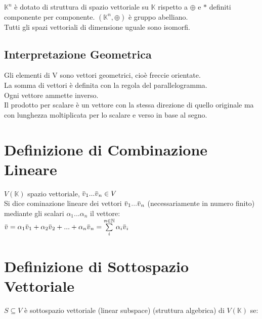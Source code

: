 \documentclass[a4paper, twoside, italian, 11pt]{book}
\newcommand{\overbar}[1] {\mkern 1.5mu\overline{\mkern-1.5mu#1\mkern-1.5mu}\mkern 1.5mu}
\newcommand{\N}{\mathbb N}
\newcommand{\K}{\mathbb K}
\begin{document}
\noindent
$\K^n$ è dotato di struttura di spazio vettoriale su $\K$ rispetto a $\oplus$ e $*$ definiti componente per componente. $(\K^n, \oplus)$ è gruppo abelliano. \\

\noindent
Tutti gli spazi vettoriali di dimensione uguale sono isomorfi.


\subsection{Interpretazione Geometrica}

Gli elementi di V sono vettori geometrici, cioè freccie orientate. \\
La somma di vettori è definita con la regola del parallelogramma. \\
Ogni vettore ammette inverso. \\
Il prodotto per scalare è un vettore con la stessa direzione di quello originale ma con lunghezza moltiplicata per lo scalare e verso in base al segno. \\





\section{Definizione di Combinazione Lineare}

$V(\K)$ spazio vettoriale, $\overbar v_1 ... \overbar v_n \in V$ \\

\noindent
Si dice cominazione lineare dei vettori $\overbar v_1 ... \overbar v_n$ (necessariamente in numero finito) mediante gli scalari $\alpha_1 ... \alpha_n$ il vettore: \\

$\overbar v = \alpha_1 \overbar v_1 + \alpha_2 \overbar v_2 + ... + \alpha_n \overbar v_n = \sum\limits_i^{n \in \N} \alpha_i \overbar v_i$



\section{Definizione di Sottospazio Vettoriale}

$S \subseteq V$ è sottospazio vettoriale (linear subspace) (struttura algebrica) di $V(\K)$ se: \\
\end{document}
